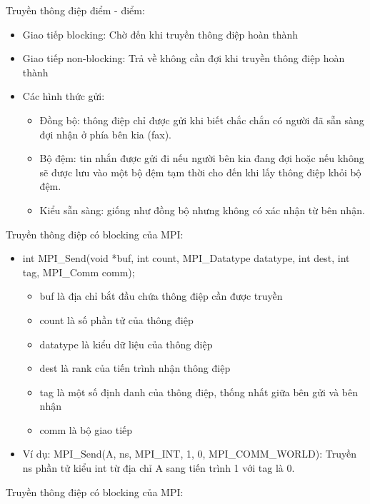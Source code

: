 \documentclass[14pt, a4paper]{article}
\numberwithin{equation}{section}
\numberwithin{figure}{section}
\numberwithin{dl}{section}
\numberwithin{md}{section}
\numberwithin{bd}{section}
\numberwithin{dn}{section}
\numberwithin{hq}{section}
\begin{document}
Truyền thông điệp điểm - điểm:

\begin{itemize}
    \item Giao tiếp blocking: Chờ đến khi truyền thông điệp hoàn thành
    \item Giao tiếp non-blocking: Trả về không cần đợi khi truyền thông điệp hoàn thành
    \item Các hình thức gửi:
    \begin{itemize}
        \item Đồng bộ: thông điệp chỉ được gửi khi biết chắc chắn có người đã sẵn sàng đợi nhận ở phía bên kia (fax).
        \item Bộ đệm: tin nhắn được gửi đi nếu người bên kia đang đợi hoặc nếu không sẽ được lưu vào một bộ đệm tạm thời cho đến khi lấy thông điệp khỏi bộ đệm.
        \item Kiểu sẵn sàng: giống như đồng bộ nhưng không có xác nhận từ bên nhận.
    \end{itemize}
\end{itemize}

Truyền thông điệp có blocking của MPI:

\begin{itemize}
    \item int MPI\_Send(void *buf, int count, MPI\_Datatype datatype,
                        int dest, int tag, MPI\_Comm comm);
    \begin{itemize}
        \item buf là địa chỉ bắt đầu chứa thông điệp cần được truyền
        \item count là số phần tử của thông điệp
        \item datatype là kiểu dữ liệu của thông điệp
        \item dest là rank của tiến trình nhận thông điệp
        \item tag là một số định danh của thông điệp, thống nhất giữa bên gửi và bên nhận
        \item comm là bộ giao tiếp
    \end{itemize}
    \item Ví dụ: MPI\_Send(A, ns, MPI\_INT, 1, 0, MPI\_COMM\_WORLD): 
    Truyền ns phần tử kiểu int từ địa chỉ A sang tiến trình 1 với tag là 0.
\end{itemize}

Truyền thông điệp có blocking của MPI:
\end{document}
